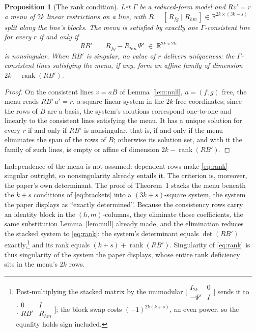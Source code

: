 \documentclass[11pt]{article}
\newtheorem{proposition}{Proposition}
\theoremstyle{remark}
\newcommand{\R}{\mathbb{R}}
\begin{document}
\begin{proposition}[The rank condition]\label{prop:rank}
Let $\Gamma$ be a reduced-form model and $Rv'=r$ a menu of $2k$ linear restrictions on a line, with $R=[\,R_{fg}\mid R_{hm}\,]\in\R^{2k\times(3k+s)}$ split along the line's blocks. The menu is satisfied by exactly one $\Gamma$-consistent line for every $r$ if and only if
\begin{equation}\label{eq:rank}
RB'\;=\;R_{fg}-R_{hm}\,\Psi'\;\in\;\R^{2k\times2k}
\end{equation}
is nonsingular. When $RB'$ is singular, no value of $r$ delivers uniqueness: the $\Gamma$-consistent lines satisfying the menu, if any, form an affine family of dimension $2k-\operatorname{rank}(RB')$.
\end{proposition}

\begin{proof}
On the consistent lines $v=aB$ of Lemma~\ref{lem:null}, $a=(f,g)$ free, the menu reads $RB'\,a'=r$, a square linear system in the $2k$ free coordinates; since the rows of $B$ are a basis, the system's solutions correspond one-to-one and linearly to the consistent lines satisfying the menu. It has a unique solution for every $r$ if and only if $RB'$ is nonsingular, that is, if and only if the menu eliminates the span of the rows of $B$; otherwise its solution set, and with it the family of such lines, is empty or affine of dimension $2k-\operatorname{rank}(RB')$.
\end{proof}

Independence of the menu is not assumed: dependent rows make \eqref{eq:rank} singular outright, so nonsingularity already entails it. The criterion is, moreover, the paper's own determinant. The proof of Theorem~1 stacks the menu beneath the $k+s$ conditions of \eqref{eq:brackets} into a $(3k+s)$-square system, the system the paper displays as ``exactly determined''. Because the consistency rows carry an identity block in the $(h,m)$-columns, they eliminate those coefficients, the same substitution Lemma~\ref{lem:null} already made, and the elimination reduces the stacked system to \eqref{eq:rank}: the system's determinant equals $\det(RB')$ exactly,\footnote{Post-multiplying the stacked matrix by the unimodular $\bigl[\begin{smallmatrix}I_{2k}&0\\-\Psi'&I\end{smallmatrix}\bigr]$ sends it to $\bigl[\begin{smallmatrix}0&I\\RB'&R_{hm}\end{smallmatrix}\bigr]$; the block swap costs $(-1)^{2k(k+s)}$, an even power, so the equality holds sign included.} and its rank equals $(k+s)+\operatorname{rank}(RB')$. Singularity of \eqref{eq:rank} is thus singularity of the system the paper displays, whose entire rank deficiency sits in the menu's $2k$ rows.
\end{document}

